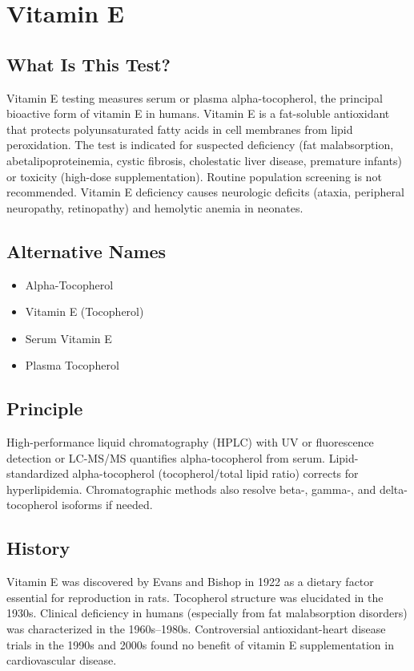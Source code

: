 \chapter{Vitamin E}

\section*{What Is This Test?}
Vitamin E testing measures serum or plasma alpha-tocopherol, the principal bioactive form of vitamin E in humans. Vitamin E is a fat-soluble antioxidant that protects polyunsaturated fatty acids in cell membranes from lipid peroxidation. The test is indicated for suspected deficiency (fat malabsorption, abetalipoproteinemia, cystic fibrosis, cholestatic liver disease, premature infants) or toxicity (high-dose supplementation). Routine population screening is not recommended. Vitamin E deficiency causes neurologic deficits (ataxia, peripheral neuropathy, retinopathy) and hemolytic anemia in neonates.

\section*{Alternative Names}
\begin{itemize}
  \item Alpha-Tocopherol
  \item Vitamin E (Tocopherol)
  \item Serum Vitamin E
  \item Plasma Tocopherol
\end{itemize}
\section*{Principle}
High-performance liquid chromatography (HPLC) with UV or fluorescence detection or LC-MS/MS quantifies alpha-tocopherol from serum. Lipid-standardized alpha-tocopherol (tocopherol/total lipid ratio) corrects for hyperlipidemia. Chromatographic methods also resolve beta-, gamma-, and delta-tocopherol isoforms if needed.

\section*{History}
Vitamin E was discovered by Evans and Bishop in 1922 as a dietary factor essential for reproduction in rats. Tocopherol structure was elucidated in the 1930s. Clinical deficiency in humans (especially from fat malabsorption disorders) was characterized in the 1960s--1980s. Controversial antioxidant-heart disease trials in the 1990s and 2000s found no benefit of vitamin E supplementation in cardiovascular disease.

